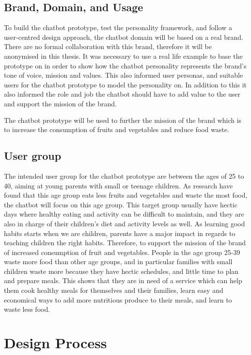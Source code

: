 \subsection{Brand, Domain, and Usage}

To build the chatbot prototype, test the personality framework, and follow a user-centred design approach, the chatbot domain will be based on a real brand. There are no formal collaboration with this brand, therefore it will be anonymised in this thesis. It was necessary to use a real life example to base the prototype on in order to show how the chatbot personality represents the brand's tone of voice, mission and values. This also informed user personas, and suitable users for the chatbot prototype to model the personality on. In addition to this it also informed the role and job the chatbot should have to add value to the user and support the mission of the brand.

The chatbot prototype will be used to further the mission of the brand which is to increase the consumption of fruits and vegetables and reduce food waste. 


\subsection{User group}

The intended user group for the chatbot prototype are between the ages of 25 to 40, aiming at young parents with small or teenage children. As research have found that this age group eats less fruits and vegetables and waste the most food, the chatbot will focus on this age group. This target group usually have hectic days where healthy eating and activity can be difficult to maintain, and they are also in charge of their children’s diet and activity levels as well. As learning good habits starts when we are children, parents have a major impact in regards to teaching children the right habits. Therefore, to support the mission of the brand of increased consumption of fruit and vegetables. People in the age group 25-39 waste more food than other age groups, and in particular families with small children waste more because they have hectic schedules, and little time to plan and prepare meals. This shows that they are in need of a service which can help them cook healthy meals for themselves and their families, learn easy and economical ways to add more nutritious produce to their meals, and learn to waste less food.


\section{Design Process}

